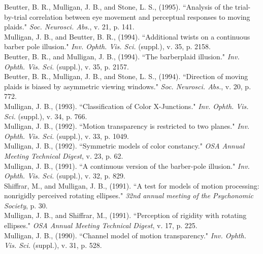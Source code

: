 \documentclass[12pt]{article}
\newcommand{\years}[1]{\marginnote{\scriptsize #1}}
\begin{document}
Beutter, B. R., Mulligan, J. B., and Stone, L. S., (1995).
``Analysis of the trial-by-trial correlation between eye movement and perceptual responses to moving plaids."
\emph{Soc. Neurosci. Abs.}, v. 21, p. 141.\\

\years{1994}
Mulligan, J. B., and Beutter, B. R., (1994).
``Additional twists on a continuous barber pole illusion."
\emph{Inv. Ophth. Vis. Sci.} (suppl.), v. 35, p. 2158.\\

Beutter, B. R., and Mulligan, J. B., (1994).
``The barberplaid illusion."
\emph{Inv. Ophth. Vis. Sci.} (suppl.), v. 35, p. 2157.\\

Beutter, B. R., Mulligan, J. B., and Stone, L. S., (1994).
``Direction of moving plaids is biased by asymmetric viewing windows."
\emph{Soc. Neurosci. Abs.},
v. 20, p. 772.\\

\years{1993}
Mulligan, J. B., (1993).
``Classification of Color X-Junctions."
\emph{Inv. Ophth. Vis. Sci.} (suppl.), v. 34, p. 766.\\

\years{1992}
Mulligan, J. B., (1992).
``Motion transparency is restricted to two planes."
\emph{Inv. Ophth. Vis. Sci.} (suppl.), v. 33, p. 1049.\\

Mulligan, J. B., (1992).
``Symmetric models of color constancy."
\emph{OSA Annual Meeting Technical Digest}, v. 23, p. 62.\\

\years{1991}
Mulligan, J. B., (1991).
``A continuous version of the barber-pole illusion."
\emph{Inv. Ophth. Vis. Sci.} (suppl.), v. 32, p. 829.\\

Shiffrar, M., and Mulligan, J. B., (1991).
``A test for models of motion processing:  nonrigidly perceived rotating ellipses."
\emph{32nd annual meeting of the Psychonomic Society}, p. 30.\\

Mulligan, J. B., and Shiffrar, M., (1991).
``Perception of rigidity with rotating ellipses."
\emph{OSA Annual Meeting Technical Digest}, v. 17, p. 225.\\

\years{1990}
Mulligan, J. B., (1990).
``Channel model of motion transparency."
\emph{Inv. Ophth. Vis. Sci.} (suppl.), v. 31, p. 528.\\
\end{document}
